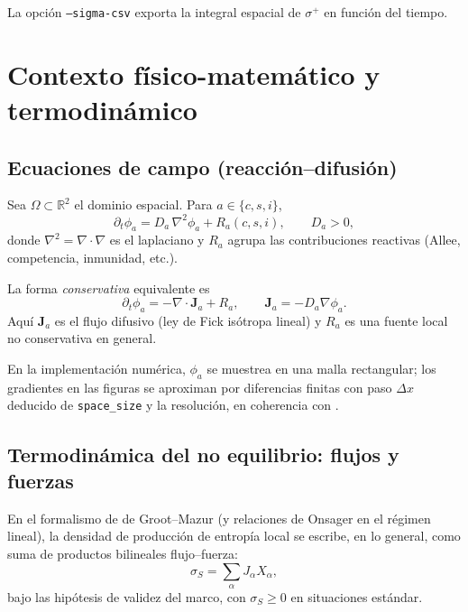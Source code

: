 \documentclass[11pt,a4paper]{article}
\newcommand{\R}{\mathbb{R}}
\newcommand{\vect}[1]{\mathbf{#1}}
\begin{document}
La opción \texttt{--sigma-csv} exporta la integral espacial de $\sigma^{+}$ en
función del tiempo.

\section{Contexto físico-matemático y termodinámico}

\subsection{Ecuaciones de campo (reacción--difusión)}

Sea $\Omega\subset\R^2$ el dominio espacial. Para $a\in\{c,s,i\}$,
\begin{equation}
\label{eq:rd}
\partial_t \phi_a = D_a \,\nabla^2 \phi_a + R_a(c,s,i),
\qquad D_a>0,
\end{equation}
donde $\nabla^2=\nabla\cdot\nabla$ es el laplaciano y $R_a$ agrupa las
contribuciones reactivas (Allee, competencia, inmunidad, etc.).

La forma \emph{conservativa} equivalente es
\begin{equation}
\label{eq:balance}
\partial_t \phi_a = -\nabla\cdot \vect{J}_a + R_a,
\qquad
\vect{J}_a = -D_a \nabla \phi_a .
\end{equation}
Aquí $\vect{J}_a$ es el flujo difusivo (ley de Fick isótropa lineal) y $R_a$ es
una fuente local no conservativa en general.

En la implementación numérica, $\phi_a$ se muestrea en una malla rectangular; los
gradientes en las figuras se aproximan por diferencias finitas con paso
$\Delta x$ deducido de \texttt{space\_size} y la resolución, en coherencia con
.

\subsection{Termodinámica del no equilibrio: flujos y fuerzas}

En el formalismo de de Groot--Mazur (y relaciones de Onsager en el régimen
lineal), la densidad de producción de entropía local se escribe, en lo general,
como suma de productos bilineales flujo--fuerza:
\begin{equation}
\label{eq:sigmaS-general}
\sigma_S = \sum_\alpha J_\alpha X_\alpha ,
\end{equation}
bajo las hipótesis de validez del marco, con $\sigma_S\ge 0$ en situaciones
estándar.
\end{document}
